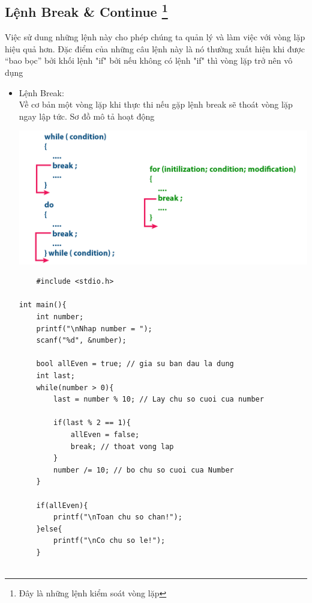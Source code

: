 \documentclass[12pt,a4paper]{article}
\begin{document}
\begin{center}
\section*{Lệnh Break \& Continue \footnote{Đây là những lệnh kiểm soát vòng lặp}}		
\end{center}
Việc sử dung những lệnh này cho phép chúng ta quản lý và làm việc với vòng lặp hiệu quả hơn. Đặc điểm của những câu lệnh này là nó thường xuất hiện khi được “bao bọc” bởi khối lệnh "if" bởi nếu không có lệnh "if" thì vòng lặp trở nên vô dụng
\begin{itemize}
	\item Lệnh Break:\\
Về cơ bản một vòng lặp khi thực thi nếu gặp lệnh break sẽ thoát vòng lặp ngay lập tức. Sơ đồ mô tả hoạt động
	\begin{center}
		\includegraphics[scale = 0.4]{break}
	\end{center}

\begin{lstlisting}
	#include <stdio.h>
 
int main(){
    int number;
    printf("\nNhap number = ");
    scanf("%d", &number);
 
    bool allEven = true; // gia su ban dau la dung
    int last;
    while(number > 0){
        last = number % 10; // Lay chu so cuoi cua number
 
        if(last % 2 == 1){
            allEven = false;
            break; // thoat vong lap
        }
        number /= 10; // bo chu so cuoi cua Number
    }
    
    if(allEven){
        printf("\nToan chu so chan!");
    }else{
        printf("\nCo chu so le!");
    }
 

\end{lstlisting}
\end{itemize}
\end{document}
